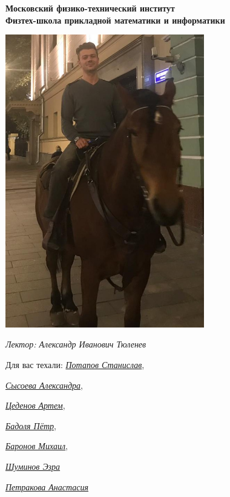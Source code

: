 \begin{titlepage}
	\clearpage\thispagestyle{empty}
	\centering
	
	\textbf{Московский физико-технический институт \\ Физтех-школа прикладной математики и информатики}
	\vspace{50pt}


	
	\includegraphics[width=0.65\textwidth]{images/Tulenev3.jpg}
 \vspace{10 pt}
 
     \textit{\large{Лектор: Александр Иванович Тюленев}
} 

	\vfill
	\begin{flushright}
    \noindent
    Для вас техали: \href{https://vk.com/invader17}{\textit{Потапов Станислав}}, 
  
    \href{https://vk.com/salexame}{\textit{ Сысоева Александра}}, 
    
    \href{https://vk.com/darkness11235}{\textit{ Цеденов Артем}},  
    
    \href{https://vk.com/akzium}{\textit{Бадоля Пётр}},
    
    \href{https://vk.com/id389655743}{\textit{Баронов Михаил}},

    \href{https://t.me/YamSuf}{\textit{Шуминов Эзра}}
    
    \href{https://vk.com/prizrakkota}{\textit{Петракова Анастасия}}
  
	\end{flushright}


	\pagebreak
\end{titlepage}